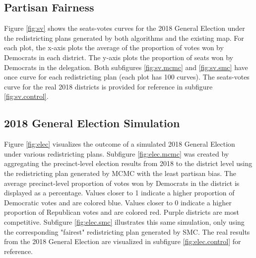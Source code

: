 \subsection{Partisan Fairness}


Figure \ref{fig:sv} shows the seats-votes curves \parencite{katz2020} for the 2018 General Election under the redistricting plans generated by both algorithms and the existing map. For each plot, the x-axis plots the average of the proportion of votes won by Democrats in each district. The y-axis plots the proportion of seats won by Democrats in the delegation. Both subfigures \ref{fig:sv.mcmc} and \ref{fig:sv.smc} have once curve for each redistricting plan (each plot has 100 curves). The seats-votes curve for the real 2018 districts is provided for reference in subfigure \ref{fig:sv.control}.

\subsection{2018 General Election Simulation}


Figure \ref{fig:elec} visualizes the outcome of a simulated 2018 General Election under various redistricting plans. Subfigure \ref{fig:elec.mcmc} was created by aggregating the precinct-level election results from 2018 to the district level using the redistricting plan generated by MCMC with the least partisan bias. The average precinct-level proportion of votes won by Democrats in the district is displayed as a percentage. Values closer to 1 indicate a higher proportion of Democratic votes and are colored blue. Values closer to 0 indicate a higher proportion of Republican votes and are colored red. Purple districts are most competitive. Subfigure \ref{fig:elec.smc} illustrates this same simulation, only using the corresponding "fairest" redistricting plan generated by SMC. The real results from the 2018 General Election are visualized in subfigure \ref{fig:elec.control} for reference. 